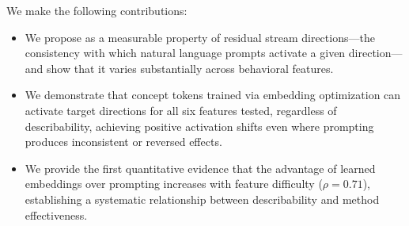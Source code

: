 We make the following contributions:
\begin{itemize}[leftmargin=*,itemsep=0pt,topsep=0pt]
    \item We propose \describability as a measurable property of residual stream directions---the consistency with which natural language prompts activate a given direction---and show that it varies substantially across behavioral features.
    \item We demonstrate that concept tokens trained via embedding optimization can activate target directions for all six features tested, regardless of describability, achieving positive activation shifts even where prompting produces inconsistent or reversed effects.
    \item We provide the first quantitative evidence that the advantage of learned embeddings over prompting increases with feature difficulty ($\rho = 0.71$), establishing a systematic relationship between describability and method effectiveness.
\end{itemize}

